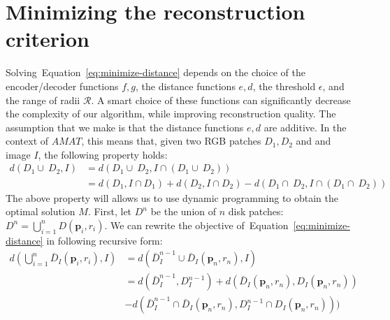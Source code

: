 \documentclass{article}
\newcommand{\refeq}[1]{Equation~\ref{#1}}
\newcommand{\set}[1]{\mathcal{#1}}
\renewcommand{\vec}[1]{\mathbf{#1}}
\def\point{\vec{p}}
\def\scales{\set{R}}
\begin{document}
\section{Minimizing the reconstruction criterion}\label{sec:minimizing}
Solving~\refeq{eq:minimize-distance} depends on the choice of the encoder/decoder functions $f,g$, 
the distance functions $e,d$, the threshold $\epsilon$, and the range of radii $\scales$.
A smart choice of these functions can significantly decrease the complexity of our algorithm, while improving
reconstruction quality.
The assumption that we make is that the distance functions $e,d$ are additive.
In the context of $AMAT$, this means that, given two RGB patches $D_1,D_2$ and and image $I$,
the following property holds:
\begin{align}
d(D_1 \cup\ D_2, I) & = d(D_1 \cup\ D_2, I \cap (D_1 \cup\ D_2)) \nonumber \\
& = d(D_1, I \cap D_1 ) + d(D_2, I \cap D_2) - d(D_1 \cap\ D_2, I \cap (D_1 \cap\ D_2))
\label{eq:additive-distance}
\end{align}
The above property will allows us to use dynamic programming to obtain the optimal solution $M$.
First, let $D^n$ be the union of $n$ disk patches: $D^n = \bigcup_{i=1}^n D(\point_i,r_i)$.
We can rewrite the objective of~\refeq{eq:minimize-distance} in following recursive form:
\begin{align}
d\left( \bigcup_{i=1}^n \bar D_I(\point_i,r_i), I \right) & = 
d\left( \bar D_I^{n-1} \cup \bar D_I(\point_n,r_n), I \right) \nonumber\\
& = d( \bar D_I^{n-1}, D_I^{n-1}) + d(\bar D_I(\point_n,r_n), D_I(\point_n,r_n) ) \nonumber \\
& - d(\bar D_I^{n-1} \cap \bar D_I(\point_n,r_n), D_I^{n-1} \cap D_I(\point_n,r_n) ))
\end{align}
\end{document}
